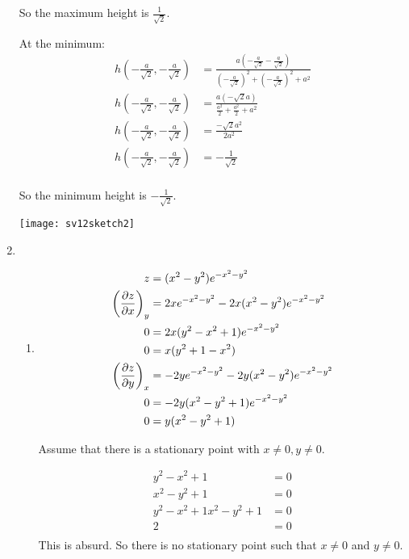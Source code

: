 \documentclass[10pt,\jkfside,a4paper]{article}
\begin{document}
\begin{enumerate}
So the maximum height is $\frac{1}{\sqrt{2}}$.

At the minimum:
\begin{equation}
\begin{split}
h(-\frac{a}{\sqrt{2}}, -\frac{a}{\sqrt{2}}) &= \frac{a\left(-\frac{a}{\sqrt{2}} - \frac{a}{\sqrt{2}}\right)}{\left(-\frac{a}{\sqrt{2}}\right)^2 + \left(-\frac{a}{\sqrt{2}}\right)^2 + a^2 } \\
h(-\frac{a}{\sqrt{2}}, -\frac{a}{\sqrt{2}}) &= \frac{a\left(-\sqrt{2}a\right)}{\frac{a^2}{2} + \frac{a^2}{2} + a^2 } \\
h(-\frac{a}{\sqrt{2}}, -\frac{a}{\sqrt{2}}) &= \frac{-\sqrt{2}a^2}{2a^2} \\
h(-\frac{a}{\sqrt{2}}, -\frac{a}{\sqrt{2}}) &= -\frac{1}{\sqrt{2}} \\
\end{split}
\end{equation}

So the minimum height is $-\frac{1}{\sqrt{2}}$.

\begin{center}
\texttt{[image: sv12sketch2]}
\end{center}

\item 
\begin{enumerate}

\item 
\begin{equation}
\begin{split}
z &= (x^{2} - y^{2})e^{- x^{2} - y^{2}} \\
\left(\pdv{z}{x}\right)_y &= 2xe^{-x^{2} - y^{2}} - 2x(x^{2} - y^{2})e^{-x^{2} - y^{2}} \\
0 &= 2x(y^{2} - x^{2} + 1)e^{-x^{2} - y^{2}} \\
0 &= x(y^{2} + 1 - x^{2}) \\
\left(\pdv{z}{y}\right)_x &= -2ye^{-x^{2} - y^{2}} - 2y(x^{2} - y^{2})e^{-x^{2} - y^{2}} \\
0 &= -2y(x^{2} - y^{2} + 1)e^{-x^{2} - y^{2}} \\
0 &= y(x^{2} - y^{2} + 1) \\
\end{split}
\end{equation}

Assume that there is a stationary point with $x \neq 0, y \neq 0$.

\begin{equation}
\begin{split}
y^{2} - x^{2} + 1 &= 0 \\
x^{2} - y^{2} + 1 &= 0 \\
y^{2} - x^{2} + 1 x^{2} - y^{2} + 1 &= 0 \\
2 &= 0 \\
\end{split}
\end{equation}
This is absurd. So there is no stationary point such that $x \neq 0$ and $y \neq 0$.


\end{enumerate}
\end{enumerate}
\end{document}
